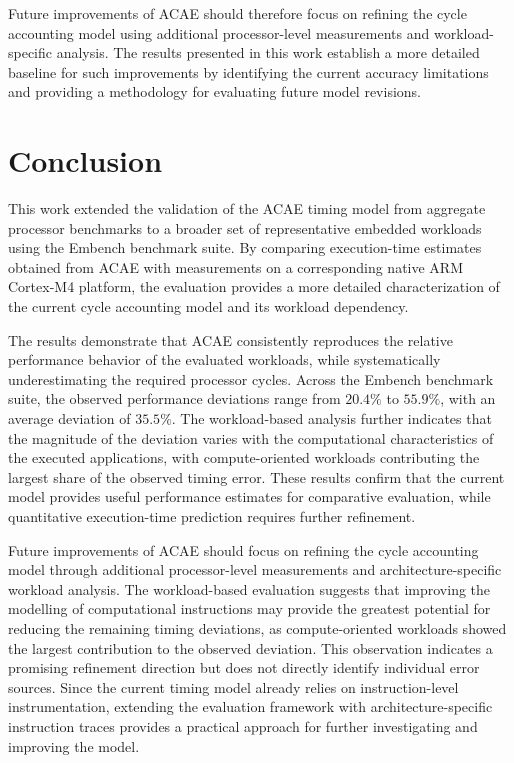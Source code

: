 \documentclass[conference]{IEEEtran}
\begin{document}
			Future improvements of \ac{ACAE} should therefore focus on refining the cycle accounting model using additional processor-level measurements and workload-specific analysis.
			The results presented in this work establish a more detailed baseline for such improvements by identifying the current accuracy limitations and providing a methodology for evaluating future model revisions.

	\section{Conclusion}
		\label{sec:conc}

		This work extended the validation of the \ac{ACAE} timing model from aggregate processor benchmarks to a broader set of representative embedded workloads using the Embench benchmark suite.
		By comparing execution-time estimates obtained from \ac{ACAE} with measurements on a corresponding native ARM Cortex-M4 platform, the evaluation provides a more detailed characterization of the current cycle accounting model and its workload dependency.

		The results demonstrate that \ac{ACAE} consistently reproduces the relative performance behavior of the evaluated workloads, while systematically underestimating the required processor cycles.
		Across the Embench benchmark suite, the observed performance deviations range from $20.4\%$ to $55.9\%$, with an average deviation of $35.5\%$.
		The workload-based analysis further indicates that the magnitude of the deviation varies with the computational characteristics of the executed applications, with compute-oriented workloads contributing the largest share of the observed timing error.
		These results confirm that the current model provides useful performance estimates for comparative evaluation, while quantitative execution-time prediction requires further refinement.
		
		Future improvements of \ac{ACAE} should focus on refining the cycle accounting model through additional processor-level measurements and architecture-specific workload analysis.
		The workload-based evaluation suggests that improving the modelling of computational instructions may provide the greatest potential for reducing the remaining timing deviations, as compute-oriented workloads showed the largest contribution to the observed deviation.
		This observation indicates a promising refinement direction but does not directly identify individual error sources.
		Since the current timing model already relies on instruction-level instrumentation, extending the evaluation framework with architecture-specific instruction traces provides a practical approach for further investigating and improving the model.

	\printbibliography
\end{document}
